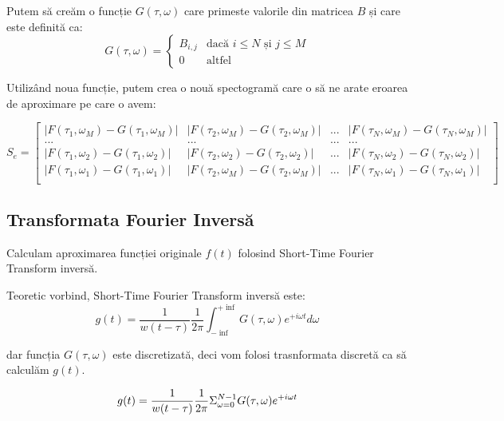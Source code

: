 \documentclass[12pt]{article}
\begin{document}
Putem să creăm o funcție $G(\tau,\omega)$ care primeste valorile din matricea $B$ și care este definită ca:
\begin{equation}
    G(\tau,\omega) = \begin{cases}
        B_{i,j} & \text{dacă } i \leq N \text{ și } j \leq M \\[6pt]
        0 & \text{altfel}
    \end{cases}
\end{equation}

Utilizând noua funcție, putem crea o nouă spectogramă care o să ne arate eroarea de aproximare pe care o avem:

\begin{equation}
	S_{e} = \begin{bmatrix}
		|F(\tau_{1},\omega_{M})  - G(\tau_{1},\omega_{M})| & |F(\tau_{2},\omega_{M})  - G(\tau_{2},\omega_{M}) | & ... & |F(\tau_{N},\omega_{M})  - G(\tau_{N},\omega_{M}) | \\
        ... & ... & ... & ... \\
		|F(\tau_{1},\omega_{2})  - G(\tau_{1},\omega_{2}) | & |F(\tau_{2},\omega_{2})  - G(\tau_{2},\omega_{2}) | & ... & |F(\tau_{N},\omega_{2})  - G(\tau_{N},\omega_{2}) | \\
        |F(\tau_{1},\omega_{1})  - G(\tau_{1},\omega_{1}) | & |F(\tau_{2},\omega_{M})  - G(\tau_{2},\omega_{M}) | & ... & |F(\tau_{N},\omega_{1})  - G(\tau_{N},\omega_{1}) | \\
	\end{bmatrix}
\end{equation}

\subsection{Transformata Fourier Inversă}\label{Modelul}

Calculam aproximarea funcției originale $f(t)$ folosind Short-Time Fourier Transform inversă.

Teoretic vorbind, Short-Time Fourier Transform inversă este:
\begin{equation}
    g(t) = \frac{1}{w(t-\tau)} \frac{1}{2\pi} \int_{-\inf}^{+\inf} G(\tau,\omega) e^{+i\omega t} d\omega
\end{equation}

dar funcția $G(\tau,\omega)$ este discretizată, deci vom folosi trasnformata discretă ca să calculăm $g(t)$.

\begin{equation}
    g(t) = \frac{1}{w(t-\tau)} \frac{1}{2\pi} \Sigma_{\omega=0}^{N-1} G(\tau,\omega) e^{+i\omega t} \\[6pt]
\end{equation}
\end{document}
